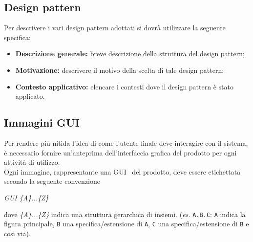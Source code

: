 {{}%

\subsection{Design pattern}\label{NormeDesPat} {
Per descrivere i vari design pattern adottati si dovrà utilizzare la seguente specifica:
\begin{itemize}
			\item {\textbf{Descrizione generale:} breve descrizione della struttura del design pattern;}
			\item {\textbf{Motivazione:} descrivere il motivo della scelta di tale design pattern;}
			\item {\textbf{Contesto applicativo:} elencare i contesti dove il design pattern è stato applicato.}
		\end{itemize}
}%

\subsection{Immagini GUI}\label{IGUI} {
Per rendere più nitida l'idea di come l'utente finale deve interagire con il sistema, è necessario fornire un'anteprima dell'interfaccia grafica del prodotto per ogni attività di utilizzo.\\
Ogni immagine, rappresentante una GUI\g~ del prodotto, deve essere etichettata secondo la seguente convenzione
	\begin{center}
		\textit{GUI \{A\}...\{Z\}}
	\end{center}
	
	dove \textit{\{A\}...\{Z\}} indica una struttura gerarchica di insiemi. (\textit{es.} \texttt{A.B.C}: \texttt{A} indica la figura principale, \texttt{B} una specifica/estensione di \texttt{A}, \texttt{C} una specifica/estensione di \texttt{B} e cosi via). 
}%

}
